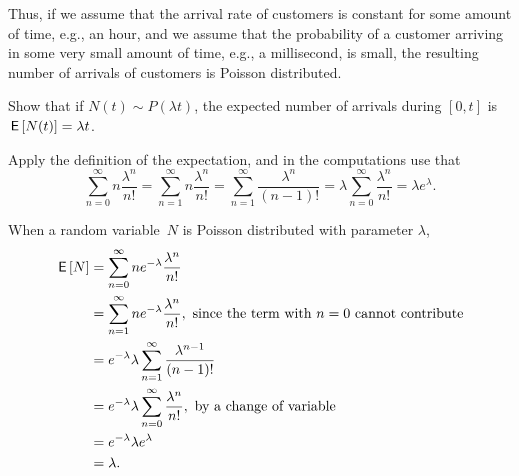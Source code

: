 Thus, if we assume that the arrival rate of customers is constant for some amount of time, e.g., an hour, and we assume that the probability of a customer arriving in some very small amount of time,  e.g., a millisecond, is small, the resulting number of arrivals of customers is Poisson distributed. 


\begin{exercise}\label{ex:2}
  Show that if $N(t)\sim P(\lambda t)$, the expected number of arrivals during $[0,t]$ is $\,\mathsf{E}\left[N(t)\right] = \lambda t$.
  \begin{hint}
Apply the definition of the expectation, and in the computations use that 
\begin{equation*}
\sum_{n=0}^\infty n \frac{\lambda^n}{n!} = \sum_{n=1}^\infty n \frac{\lambda^n}{n!} = \sum_{n=1}^\infty \frac{\lambda^n}{(n-1)!} = \lambda \sum_{n=0}^\infty \frac{\lambda^n}{n!} = \lambda e^{\lambda}.
\end{equation*}
  \end{hint}
  \begin{solution} 
    When a random variable~$N$ is Poisson distributed with parameter
    $\lambda$,
    \begin{align*}
      \,\mathsf{E}\left[N\right] 
&= \sum_{n=0}^\infty n e^{-\lambda}\frac{\lambda^n}{n!}  \\
&= \sum_{n=1}^\infty n e^{-\lambda}\frac{\lambda^n}{n!}, \text{ since the term with $n=0$ cannot contribute} \\
&= e^{-\lambda} \lambda \sum_{n=1}^\infty \frac{\lambda^{n-1}}{(n-1)!} \\
&= e^{-\lambda} \lambda \sum_{n=0}^\infty \frac{\lambda^{n}}{n!}, \text{ by a change of variable}\\
&= e^{-\lambda} \lambda e^{\lambda} \\
&= \lambda.
    \end{align*}
\end{solution}
\end{exercise}


